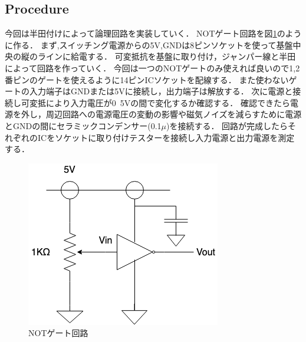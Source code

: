 \documentclass[11pt, a4paper,twocolumn]{jarticle}
\begin{document}
\subsection{Procedure}
今回は半田付けによって論理回路を実装していく．
NOTゲート回路を図\ref{fig:5}のように作る．
まず,スイッチング電源からの5V,GNDは8ピンソケットを使って基盤中央の縦のラインに給電する．
可変抵抗を基盤に取り付け，ジャンパー線と半田によって回路を作っていく．
今回は一つのNOTゲートのみ使えれば良いので1,2番ピンのゲートを使えるように14ピンICソケットを配線する．
また使わないゲートの入力端子はGNDまたは5Vに接続し，出力端子は解放する．
次に電源と接続し可変抵により入力電圧が0~5Vの間で変化するか確認する．
確認できたら電源を外し，周辺回路への電源電圧の変動の影響や磁気ノイズを減らすために電源とGNDの間にセラミックコンデンサー(0.1$\mu$)を接続する．
回路が完成したらそれぞれのICをソケットに取り付けテスターを接続し入力電源と出力電源を測定する．
\begin{figure}[htbp]
 \begin{center}
  \includegraphics[width=0.8\linewidth]{fig5.png}
 \end{center}
 \caption{NOTゲート回路}
 \label{fig:5}
\end{figure}
\end{document}
